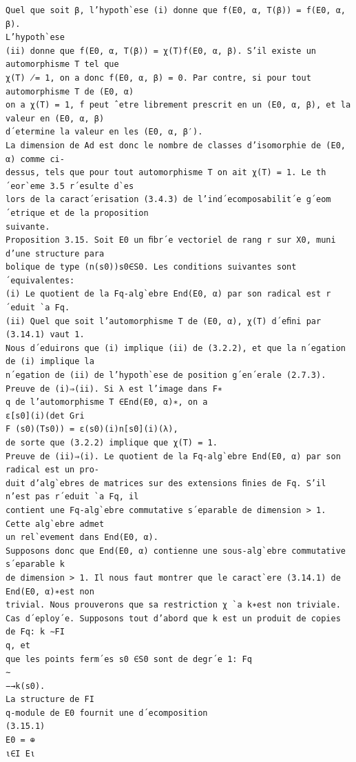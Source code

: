 \documentclass[11pt]{article}
\begin{document}
\begin{Verbatim}[breaklines=true,fontsize=\small]
Quel que soit β, l’hypoth`ese (i) donne que f(E0, α, T(β)) = f(E0, α, β).
L’hypoth`ese
(ii) donne que f(E0, α, T(β)) = χ(T)f(E0, α, β). S’il existe un automorphisme T tel que
χ(T) ̸= 1, on a donc f(E0, α, β) = 0. Par contre, si pour tout automorphisme T de (E0, α)
on a χ(T) = 1, f peut ˆetre librement prescrit en un (E0, α, β), et la valeur en (E0, α, β)
d´etermine la valeur en les (E0, α, β′).
La dimension de Ad est donc le nombre de classes d’isomorphie de (E0, α) comme ci-
dessus, tels que pour tout automorphisme T on ait χ(T) = 1. Le th´eor`eme 3.5 r´esulte d`es
lors de la caract´erisation (3.4.3) de l’ind´ecomposabilit´e g´eom´etrique et de la proposition
suivante.
Proposition 3.15. Soit E0 un ﬁbr´e vectoriel de rang r sur X0, muni d’une structure para
bolique de type (n(s0))s0∈S0. Les conditions suivantes sont ´equivalentes:
(i) Le quotient de la Fq-alg`ebre End(E0, α) par son radical est r´eduit `a Fq.
(ii) Quel que soit l’automorphisme T de (E0, α), χ(T) d´eﬁni par (3.14.1) vaut 1.
Nous d´eduirons que (i) implique (ii) de (3.2.2), et que la n´egation de (i) implique la
n´egation de (ii) de l’hypoth`ese de position g´en´erale (2.7.3).
Preuve de (i)⇒(ii). Si λ est l’image dans F∗
q de l’automorphisme T ∈End(E0, α)∗, on a
ε[s0](i)(det Gri
F (s0)(Ts0)) = ε(s0)(i)n[s0](i)(λ),
de sorte que (3.2.2) implique que χ(T) = 1.
Preuve de (ii)⇒(i). Le quotient de la Fq-alg`ebre End(E0, α) par son radical est un pro-
duit d’alg`ebres de matrices sur des extensions ﬁnies de Fq. S’il n’est pas r´eduit `a Fq, il
contient une Fq-alg`ebre commutative s´eparable de dimension > 1. Cette alg`ebre admet
un rel`evement dans End(E0, α).
Supposons donc que End(E0, α) contienne une sous-alg`ebre commutative s´eparable k
de dimension > 1. Il nous faut montrer que le caract`ere (3.14.1) de End(E0, α)∗est non
trivial. Nous prouverons que sa restriction χ `a k∗est non triviale.
Cas d´eploy´e. Supposons tout d’abord que k est un produit de copies de Fq: k ∼FI
q, et
que les points ferm´es s0 ∈S0 sont de degr´e 1: Fq
∼
−→k(s0).
La structure de FI
q-module de E0 fournit une d´ecomposition
(3.15.1)
E0 = ⊕
ι∈I Eι


\end{Verbatim}
\end{document}
